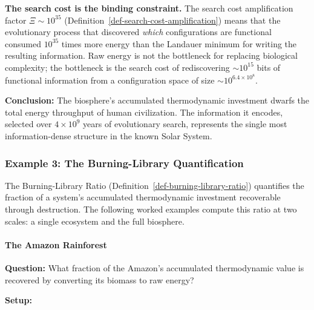 \documentclass[11pt]{article}
\theoremstyle{plain}
\theoremstyle{definition}
\theoremstyle{remark}
\let\origsubsubsection\subsubsection
\renewcommand{\subsubsection}{\needspace{4\baselineskip}\origsubsubsection}
\let\origparagraphcmd\paragraph
\renewcommand{\paragraph}{\needspace{3\baselineskip}\origparagraphcmd}
\begin{document}
\textbf{The search cost is the binding constraint.} The search cost
amplification factor \(\Xi \sim 10^{35}\)
(Definition~\ref{def-search-cost-amplification}) means that the
evolutionary process that discovered \emph{which} configurations are
functional consumed \(10^{35}\) times more energy than the Landauer
minimum for writing the resulting information. Raw energy is not the
bottleneck for replacing biological complexity; the bottleneck is the
search cost of rediscovering \(\sim 10^{15}\) bits of functional
information from a configuration space of size
\(\sim 10^{6.4 \times 10^8}\).

\textbf{Conclusion:} The biosphere's accumulated thermodynamic
investment dwarfs the total energy throughput of human civilization. The
information it encodes, selected over \(4 \times 10^9\) years of
evolutionary search, represents the single most information-dense
structure in the known Solar System.

\subsubsection{Example 3: The Burning-Library
Quantification}\label{example-3-the-burning-library-quantification}

The Burning-Library Ratio (Definition~\ref{def-burning-library-ratio})
quantifies the fraction of a system's accumulated thermodynamic
investment recoverable through destruction. The following worked
examples compute this ratio at two scales: a single ecosystem and the
full biosphere.

\paragraph{The Amazon Rainforest}\label{the-amazon-rainforest}

\textbf{Question:} What fraction of the Amazon's accumulated
thermodynamic value is recovered by converting its biomass to raw
energy?

\textbf{Setup:}
\end{document}
